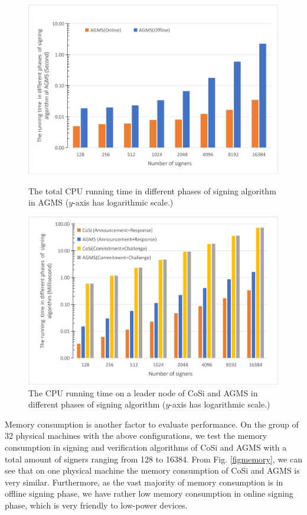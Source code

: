 \documentclass[journal]{IEEEtran}
\begin{document}
\begin{figure}[htbp]
\begin{minipage}[t]{0.45\linewidth}
\centering
\includegraphics[width=\textwidth]{Fig4.jpg}
\caption{The total CPU running time in different phases of signing algorithm in AGMS ($y$-axis has logarithmic scale.)} \label{fig4}
\end{minipage}
\hfill
\begin{minipage}[t]{0.45\linewidth}
\centering
\includegraphics[width=\textwidth]{Fig5.jpg}
\caption{The CPU running time on a leader node of CoSi and AGMS in different phases of signing algorithm ($y$-axis has logarithmic scale.)} \label{fig5}
\end{minipage}
\end{figure}

Memory consumption is another factor to evaluate performance. On the group of 32 physical machines with the above configurations, we test the memory consumption in signing and verification algorithms of CoSi and AGMS with a total amount of signers ranging from 128 to 16384. From Fig. \ref{figmemory}, we can see that on one physical machine the memory consumption of CoSi and AGMS is very similar. Furthermore, as the vast majority of memory consumption is in offline signing phase, we have rather low memory consumption in online signing phase, which is very friendly to low-power devices.
\end{document}
